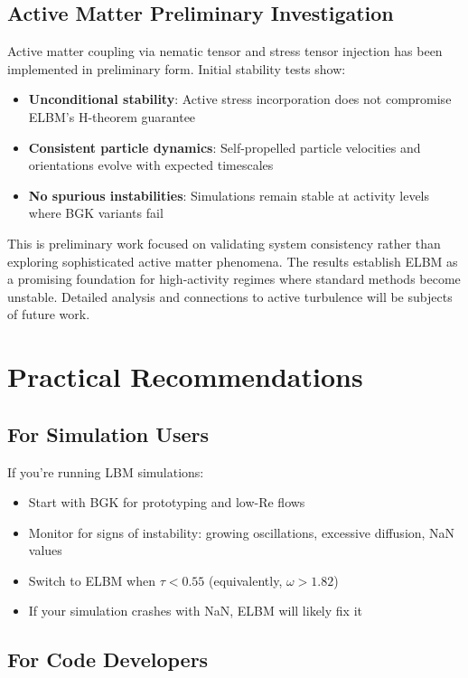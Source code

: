 \subsection{Active Matter Preliminary Investigation}

Active matter coupling via nematic tensor and stress tensor injection has been implemented in preliminary form. Initial stability tests show:

\begin{itemize}
    \item \textbf{Unconditional stability}: Active stress incorporation does not compromise ELBM's H-theorem guarantee
    \item \textbf{Consistent particle dynamics}: Self-propelled particle velocities and orientations evolve with expected timescales
    \item \textbf{No spurious instabilities}: Simulations remain stable at activity levels where BGK variants fail
\end{itemize}

This is preliminary work focused on validating system consistency rather than exploring sophisticated active matter phenomena. The results establish ELBM as a promising foundation for high-activity regimes where standard methods become unstable. Detailed analysis and connections to active turbulence will be subjects of future work.

\section{Practical Recommendations}

\subsection{For Simulation Users}

If you're running LBM simulations:
\begin{itemize}
    \item Start with BGK for prototyping and low-Re flows
    \item Monitor for signs of instability: growing oscillations, excessive diffusion, NaN values
    \item Switch to ELBM when $\tau < 0.55$ (equivalently, $\omega > 1.82$)
    \item If your simulation crashes with NaN, ELBM will likely fix it
\end{itemize}

\subsection{For Code Developers}

